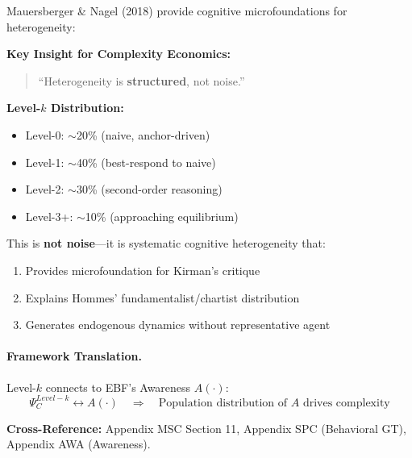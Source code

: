 Mauersberger \& Nagel (2018) provide cognitive microfoundations for heterogeneity:

\begin{tcolorbox}[colback=yellow!5!white, colframe=yellow!75!black,
    title=\textbf{M\&N (2018): Level-$k$ as Structured Heterogeneity}]

\textbf{Key Insight for Complexity Economics:}
\begin{quote}
``Heterogeneity is \textbf{structured}, not noise.''
\end{quote}

\textbf{Level-$k$ Distribution:}
\begin{itemize}[nosep]
    \item Level-0: $\sim$20\% (naive, anchor-driven)
    \item Level-1: $\sim$40\% (best-respond to naive)
    \item Level-2: $\sim$30\% (second-order reasoning)
    \item Level-3+: $\sim$10\% (approaching equilibrium)
\end{itemize}

This is \textbf{not noise}---it is systematic cognitive heterogeneity that:
\begin{enumerate}[nosep]
    \item Provides microfoundation for Kirman's critique
    \item Explains Hommes' fundamentalist/chartist distribution
    \item Generates endogenous dynamics without representative agent
\end{enumerate}

\end{tcolorbox}

\paragraph{Framework Translation.}
Level-$k$ connects to EBF's Awareness $A(\cdot)$:
\begin{equation}
\Psi_C^{Level-k} \leftrightarrow A(\cdot) \quad \Rightarrow \quad
\text{Population distribution of } A \text{ drives complexity}
\end{equation}

\textbf{Cross-Reference:} Appendix MSC Section 11, Appendix SPC (Behavioral GT),
Appendix AWA (Awareness).

